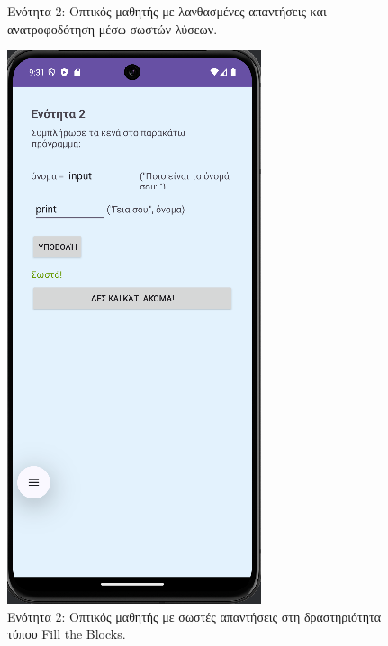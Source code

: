 \documentclass[11pt]{report}
\begin{document}
\begin{figure}[H]
\begin{minipage}[b]{0.45\textwidth}
    \caption{Ενότητα 2: Οπτικός μαθητής με λανθασμένες απαντήσεις και ανατροφοδότηση μέσω σωστών λύσεων.}
  \end{minipage}
  \hfill
  \begin{minipage}[b]{0.45\textwidth}
    \includegraphics[width=\linewidth, height=0.35\textheight, keepaspectratio]{Figures/εικόνα (4).png}
    \caption{Ενότητα 2: Οπτικός μαθητής με σωστές απαντήσεις στη δραστηριότητα τύπου Fill the Blocks.}
  \end{minipage}
\end{figure}
\end{document}
